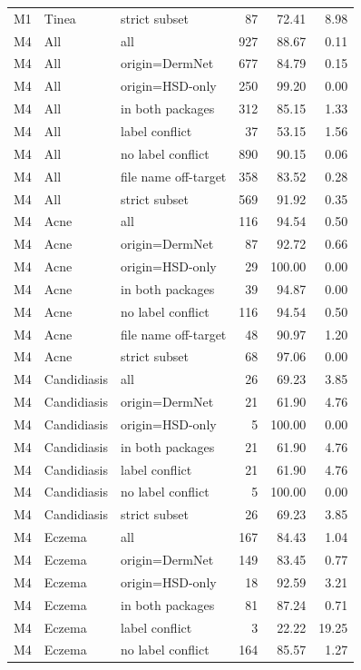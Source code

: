 \begin{tabular}{lllrrr}
M1 & Tinea & strict subset & 87 & 72.41 & 8.98 \\
M4 & All & all & 927 & 88.67 & 0.11 \\
M4 & All & origin=DermNet & 677 & 84.79 & 0.15 \\
M4 & All & origin=HSD-only & 250 & 99.20 & 0.00 \\
M4 & All & in both packages & 312 & 85.15 & 1.33 \\
M4 & All & label conflict & 37 & 53.15 & 1.56 \\
M4 & All & no label conflict & 890 & 90.15 & 0.06 \\
M4 & All & file name off-target & 358 & 83.52 & 0.28 \\
M4 & All & strict subset & 569 & 91.92 & 0.35 \\
M4 & Acne & all & 116 & 94.54 & 0.50 \\
M4 & Acne & origin=DermNet & 87 & 92.72 & 0.66 \\
M4 & Acne & origin=HSD-only & 29 & 100.00 & 0.00 \\
M4 & Acne & in both packages & 39 & 94.87 & 0.00 \\
M4 & Acne & no label conflict & 116 & 94.54 & 0.50 \\
M4 & Acne & file name off-target & 48 & 90.97 & 1.20 \\
M4 & Acne & strict subset & 68 & 97.06 & 0.00 \\
M4 & Candidiasis & all & 26 & 69.23 & 3.85 \\
M4 & Candidiasis & origin=DermNet & 21 & 61.90 & 4.76 \\
M4 & Candidiasis & origin=HSD-only & 5 & 100.00 & 0.00 \\
M4 & Candidiasis & in both packages & 21 & 61.90 & 4.76 \\
M4 & Candidiasis & label conflict & 21 & 61.90 & 4.76 \\
M4 & Candidiasis & no label conflict & 5 & 100.00 & 0.00 \\
M4 & Candidiasis & strict subset & 26 & 69.23 & 3.85 \\
M4 & Eczema & all & 167 & 84.43 & 1.04 \\
M4 & Eczema & origin=DermNet & 149 & 83.45 & 0.77 \\
M4 & Eczema & origin=HSD-only & 18 & 92.59 & 3.21 \\
M4 & Eczema & in both packages & 81 & 87.24 & 0.71 \\
M4 & Eczema & label conflict & 3 & 22.22 & 19.25 \\
M4 & Eczema & no label conflict & 164 & 85.57 & 1.27 \\

\end{tabular}
